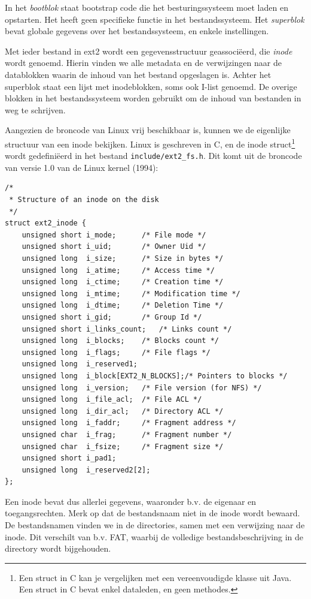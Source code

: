 In het \emph{bootblok} staat bootstrap code die het besturingssysteem moet laden en opstarten.
Het heeft geen specifieke functie in het bestandssysteem. Het \emph{superblok} bevat globale
gegevens over het bestandssysteem, en enkele instellingen.

Met ieder bestand in ext2 wordt een gegevensstructuur geassoci\"eerd, die \emph{inode} wordt genoemd.
Hierin vinden we alle metadata en de verwijzingen naar de datablokken waarin de inhoud
van het bestand opgeslagen is. Achter het superblok staat een lijst met inodeblokken, soms ook
I-list genoemd. De overige blokken in het bestandssysteem worden gebruikt om de inhoud van bestanden
in weg te schrijven.

Aangezien de broncode van Linux vrij beschikbaar is, kunnen we de eigenlijke structuur van een inode
bekijken. Linux is geschreven in C, en de inode struct\footnote{Een struct in C kan je vergelijken
met een vereenvoudigde klasse uit Java. Een struct in C bevat enkel dataleden, en geen methodes.}
wordt gedefini\"eerd in het bestand \verb|include/ext2_fs.h|. Dit komt uit de broncode van versie 1.0
van de Linux kernel (1994):

\begin{verbatim}
/*
 * Structure of an inode on the disk
 */
struct ext2_inode {
    unsigned short i_mode;      /* File mode */
    unsigned short i_uid;       /* Owner Uid */
    unsigned long  i_size;      /* Size in bytes */
    unsigned long  i_atime;     /* Access time */
    unsigned long  i_ctime;     /* Creation time */
    unsigned long  i_mtime;     /* Modification time */
    unsigned long  i_dtime;     /* Deletion Time */
    unsigned short i_gid;       /* Group Id */
    unsigned short i_links_count;   /* Links count */
    unsigned long  i_blocks;    /* Blocks count */
    unsigned long  i_flags;     /* File flags */
    unsigned long  i_reserved1;
    unsigned long  i_block[EXT2_N_BLOCKS];/* Pointers to blocks */
    unsigned long  i_version;   /* File version (for NFS) */
    unsigned long  i_file_acl;  /* File ACL */
    unsigned long  i_dir_acl;   /* Directory ACL */
    unsigned long  i_faddr;     /* Fragment address */
    unsigned char  i_frag;      /* Fragment number */
    unsigned char  i_fsize;     /* Fragment size */
    unsigned short i_pad1;
    unsigned long  i_reserved2[2];
};
\end{verbatim}

Een inode bevat dus allerlei gegevens, waaronder b.v. de eigenaar en toegangsrechten. Merk op
dat de bestandsnaam niet in de inode wordt bewaard. De bestandsnamen vinden we in de directories,
samen met een verwijzing naar de inode. Dit verschilt van b.v. FAT, waarbij de volledige
bestandsbeschrijving in de directory wordt bijgehouden.

